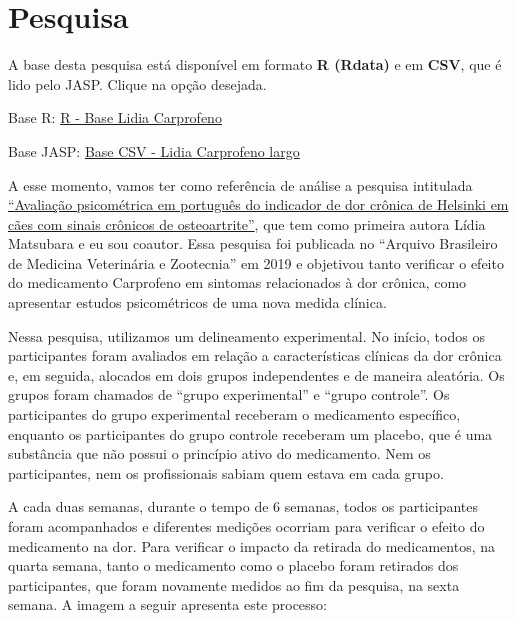 \documentclass[
]{book}
\newenvironment{base}{
  \definecolor{shadecolor}{rgb}{0.972,0.972,0.972}  %
  \color{black}
  \begin{shaded}}
 {\end{shaded}}
\begin{document}
\hypertarget{pesquisa-6}{%
\section{Pesquisa}\label{pesquisa-6}}

\begin{base}
A base desta pesquisa está disponível em formato \textbf{R (Rdata)} e em \textbf{CSV}, que é lido pelo JASP. Clique na opção desejada.

Base R: \href{https://github.com/anovabr/mqt/raw/master/bases/R\%20-\%20Base\%20Lidia\%20Carprofeno.RData}{R - Base Lidia Carprofeno}

Base JASP: \href{https://github.com/anovabr/mqt/raw/master/bases/bases_csv_jasp.zip}{Base CSV - Lidia Carprofeno largo}

\end{base}

A esse momento, vamos ter como referência de análise a pesquisa intitulada \href{https://www.scielo.br/scielo.php?script=sci_arttext\&pid=S0102-09352019000100109}{``Avaliação psicométrica em português do indicador de dor crônica de Helsinki em cães com sinais crônicos de osteoartrite''}, que tem como primeira autora Lídia Matsubara e eu sou coautor. Essa pesquisa foi publicada no ``Arquivo Brasileiro de Medicina Veterinária e Zootecnia'' em 2019 e objetivou tanto verificar o efeito do medicamento Carprofeno em sintomas relacionados à dor crônica, como apresentar estudos psicométricos de uma nova medida clínica.

Nessa pesquisa, utilizamos um delineamento experimental. No início, todos os participantes foram avaliados em relação a características clínicas da dor crônica e, em seguida, alocados em dois grupos independentes e de maneira aleatória. Os grupos foram chamados de ``grupo experimental'' e ``grupo controle''. Os participantes do grupo experimental receberam o medicamento específico, enquanto os participantes do grupo controle receberam um placebo, que é uma substância que não possui o princípio ativo do medicamento. Nem os participantes, nem os profissionais sabiam quem estava em cada grupo.

A cada duas semanas, durante o tempo de 6 semanas, todos os participantes foram acompanhados e diferentes medições ocorriam para verificar o efeito do medicamento na dor. Para verificar o impacto da retirada do medicamentos, na quarta semana, tanto o medicamento como o placebo foram retirados dos participantes, que foram novamente medidos ao fim da pesquisa, na sexta semana. A imagem a seguir apresenta este processo:
\end{document}
